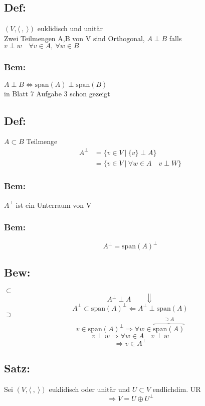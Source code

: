 \documentclass[titlepage,12pt,a4paper,ngerman]{report}
\newcommand{\tx}[1]{\textrm{#1}}
\newcommand{\spa}{\tx{span}}
\begin{document}

\subsection{Def:}$ (V,\langle\ ,\ \rangle) $ euklidisch und unitär\\
Zwei Teilmengen A,B von V sind Orthogonal, $ A \perp B $ falls $ v \perp w \quad \forall v \in A,\  \forall w \in B$
\subsubsection{Bem:}
$ A \perp B \Leftrightarrow \spa(A) \perp \spa(B) $\\
in Blatt 7 Aufgabe 3 schon gezeigt
\subsection{Def:}
$ A \subset B $ Teilmenge
\begin{align*}
A ^\perp &= \{ v \in V\ |\ \{v\} \perp A\}\\
&= \{ v \in V\ |\ \forall w \in A \quad v \perp W\}
\end{align*}
\subsubsection{Bem:}
$ A^\perp $ ist ein Unterraum von V
\subsubsection{Bem:}
$$ A^\perp = \spa(A)^\perp $$
\subsection{Bew:}
$ \boxed{\subset} $\\
$$ A^\perp \perp A \quad \quad \Downarrow$$
$$ A^\perp \subset \spa(A)^\perp \Leftarrow A^\perp \perp \spa(A)$$
$ \boxed{\supset} $\\
$$ v \in \spa(A)^\perp \Rightarrow \forall w \in \overbrace{\spa(A)}^{\supset A}$$
$$ v \perp w \Rightarrow \forall w \in A \quad v \perp w $$
$$ \Rightarrow v \in A^\perp$$
\subsection{Satz:}
Sei $ (V,\langle\ ,\ \rangle) $ euklidisch oder unitär und $ U \subset V $ endlichdim. UR
$$ \Rightarrow V = U \oplus U^\perp$$
\end{document}

